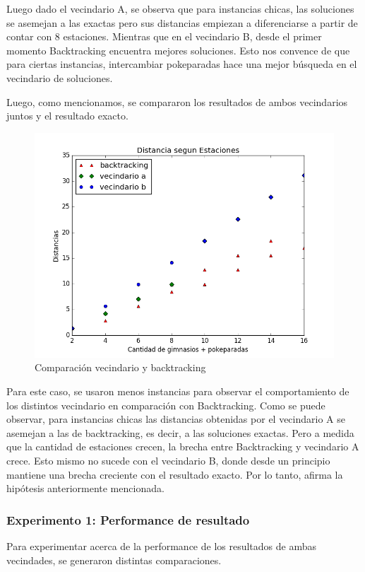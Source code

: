 \par Luego dado el vecindario A, se observa que para instancias chicas, las soluciones se asemejan a las exactas pero sus distancias empiezan a diferenciarse a partir de contar con 8 estaciones. Mientras que en el vecindario B, desde el primer momento Backtracking encuentra mejores soluciones. Esto nos convence de que  para ciertas instancias, intercambiar pokeparadas hace una mejor búsqueda en el vecindario de soluciones. 

Luego, como mencionamos, se compararon los resultados de ambos vecindarios juntos y el resultado exacto.

  \begin{figure}[H]
      \begin{center}
        \includegraphics[width=0.7\columnwidth]{imagenes/Exp2Ej3TODO.png}
        \caption{Comparación vecindario y backtracking}
      \end{center}
  \end{figure}


Para este caso, se usaron menos instancias para observar el comportamiento de los distintos vecindario en comparación con Backtracking.  Como se puede observar, para instancias chicas las distancias obtenidas por el vecindario A se asemejan a las de backtracking, es decir, a las soluciones exactas. Pero a medida que la cantidad de estaciones crecen, la brecha entre Backtracking y vecindario A crece. Esto mismo no sucede con el vecindario B, donde desde un principio mantiene una brecha creciente con el resultado exacto. Por lo tanto, afirma la hipótesis anteriormente mencionada.

\subsubsection{Experimento 1: Performance de resultado} 
            Para experimentar acerca de la performance de los resultados de ambas vecindades, se generaron distintas comparaciones. 

